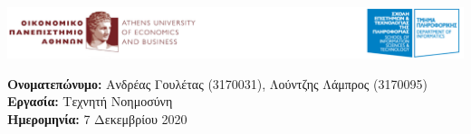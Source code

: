 \begin{titlepage}
    \vspace*{-0.6in}
    \begin{flushleft}
        \includegraphics[scale=0.44]{images/logo.png}
        
        \vspace{1cm}
        \textbf{Ονοματεπώνυμο:} Ανδρέας Γουλέτας (3170031), Λούντζης Λάμπρος (3170095)\\ 
        \textbf{Εργασία:} Τεχνητή Νοημοσύνη\\
        \textbf{Ημερομηνία:} 7 Δεκεμβρίου 2020
        
    \end{flushleft}
    \vspace{0.2in}
\end{titlepage}